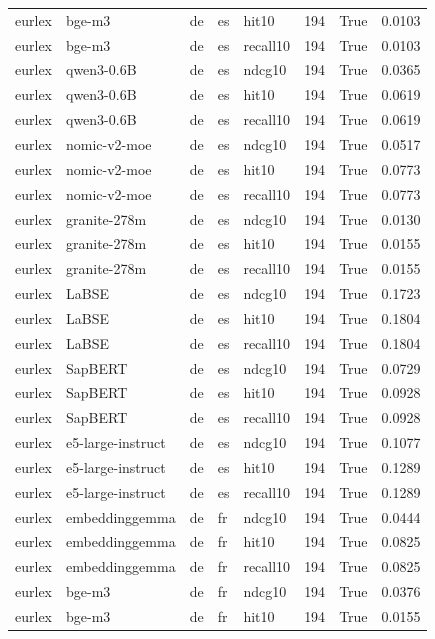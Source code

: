 \begin{tabular}{lllllrrr}
eurlex & bge-m3 & de & es & hit10 & 194 & True & 0.0103 \\
eurlex & bge-m3 & de & es & recall10 & 194 & True & 0.0103 \\
eurlex & qwen3-0.6B & de & es & ndcg10 & 194 & True & 0.0365 \\
eurlex & qwen3-0.6B & de & es & hit10 & 194 & True & 0.0619 \\
eurlex & qwen3-0.6B & de & es & recall10 & 194 & True & 0.0619 \\
eurlex & nomic-v2-moe & de & es & ndcg10 & 194 & True & 0.0517 \\
eurlex & nomic-v2-moe & de & es & hit10 & 194 & True & 0.0773 \\
eurlex & nomic-v2-moe & de & es & recall10 & 194 & True & 0.0773 \\
eurlex & granite-278m & de & es & ndcg10 & 194 & True & 0.0130 \\
eurlex & granite-278m & de & es & hit10 & 194 & True & 0.0155 \\
eurlex & granite-278m & de & es & recall10 & 194 & True & 0.0155 \\
eurlex & LaBSE & de & es & ndcg10 & 194 & True & 0.1723 \\
eurlex & LaBSE & de & es & hit10 & 194 & True & 0.1804 \\
eurlex & LaBSE & de & es & recall10 & 194 & True & 0.1804 \\
eurlex & SapBERT & de & es & ndcg10 & 194 & True & 0.0729 \\
eurlex & SapBERT & de & es & hit10 & 194 & True & 0.0928 \\
eurlex & SapBERT & de & es & recall10 & 194 & True & 0.0928 \\
eurlex & e5-large-instruct & de & es & ndcg10 & 194 & True & 0.1077 \\
eurlex & e5-large-instruct & de & es & hit10 & 194 & True & 0.1289 \\
eurlex & e5-large-instruct & de & es & recall10 & 194 & True & 0.1289 \\
eurlex & embeddinggemma & de & fr & ndcg10 & 194 & True & 0.0444 \\
eurlex & embeddinggemma & de & fr & hit10 & 194 & True & 0.0825 \\
eurlex & embeddinggemma & de & fr & recall10 & 194 & True & 0.0825 \\
eurlex & bge-m3 & de & fr & ndcg10 & 194 & True & 0.0376 \\
eurlex & bge-m3 & de & fr & hit10 & 194 & True & 0.0155 \\

\end{tabular}
